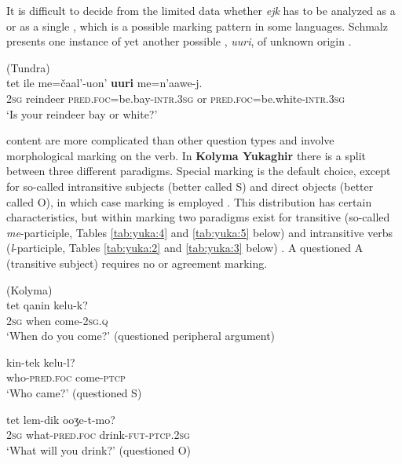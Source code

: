 \noindent It is difficult to decide from the limited data whether \textit{ejk} has to be analyzed as a  or as a single , which is a possible marking pattern in some languages. Schmalz presents one instance of yet another possible , \textit{uuri}, of unknown origin \citep[445]{Nikolaeva2006}.

\ea%
    \label{ex:yuka:9}
     (Tundra)\\
    \gll tet  ile me=čaal’-uon’ \textbf{uuri} me{=n’aawe-j.}\\
    2\textsc{sg}  reindeer \textsc{pred.foc}=be.bay-\textsc{intr.3sg}  or \textsc{pred.foc}=be.white-\textsc{intr.3sg}\\
    \glt ‘Is your reindeer bay or white?’ \citep[88]{Schmalz2012}
    \z

 content  are more complicated than other question types and involve morphological marking on the verb. In \textbf{Kolyma Yukaghir} there is a split between three different paradigms. Special  marking is the default choice, except for so-called intransitive subjects (better called S) and direct objects (better called O), in which case  marking is employed \citep[245]{Nagasaki2011}. This distribution has certain  characteristics, but within  marking two paradigms exist for transitive (so-called \textit{me}-participle, Tables \ref{tab:yuka:4} and \ref{tab:yuka:5} below) and intransitive verbs (\textit{l}-participle, Tables \ref{tab:yuka:2} and \ref{tab:yuka:3} below) \citep[240]{Nagasaki2011}. A questioned A (transitive subject) requires no  or agreement marking.

\ea%
    \label{ex:yuka:10}
     (Kolyma)\\
    \ea
    \gll tet qanin kelu-{k}?\\
    2\textsc{sg}  when  come-2\textsc{sg.q}\\
    \glt ‘When do you come?’ (questioned peripheral argument)
    
    \ex
    \gll kin{-tek} kelu-{l}?\\
    who-\textsc{pred.foc}    come-\textsc{ptcp}\\
    \glt ‘Who came?’ (questioned S)
    
    \ex
    \gll tet lem{-}{dik} ooʒe-t-{mo}?\\
    2\textsc{sg}  what-\textsc{pred.foc}  drink-\textsc{fut}-\textsc{ptcp}.2\textsc{sg}\\
    \glt ‘What will you drink?’ (questioned O)
    
